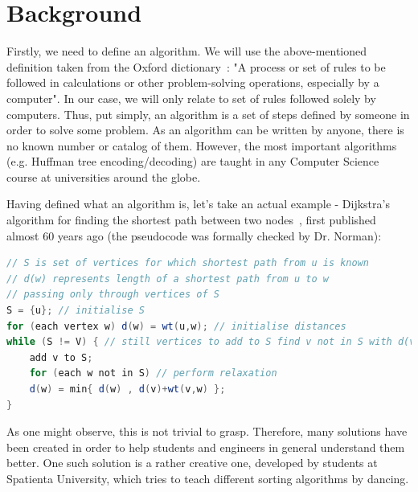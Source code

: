 \documentclass{l4proj}
\begin{document}

\chapter{Background}
\label{background}

Firstly, we need to define an algorithm. We will use the above-mentioned definition taken from the Oxford dictionary~\cite{oxford-dict}: "A process or set of rules to be followed in calculations or other problem-solving operations, especially by a computer". In our case, we will only relate to set of rules followed solely by computers. Thus, put simply, an algorithm is a set of steps defined by someone in order to solve some problem. As an algorithm can be written by anyone, there is no known number or catalog of them. However, the most important algorithms (e.g. Huffman tree encoding/decoding) are taught in any Computer Science course at universities around the globe.

Having defined what an algorithm is, let's take an actual example - Dijkstra's algorithm for finding the shortest path between two nodes~\cite{dijkstra-shortest-path}, first published almost 60 years ago (the pseudocode was formally checked by Dr. Norman):

\begin{lstlisting}[language=Java, caption=Pseudocode for Dijkstra's shortest path algorithm]
// S is set of vertices for which shortest path from u is known
// d(w) represents length of a shortest path from u to w
// passing only through vertices of S
S = {u}; // initialise S
for (each vertex w) d(w) = wt(u,w); // initialise distances
while (S != V) { // still vertices to add to S find v not in S with d(v) minimum;
	add v to S;
	for (each w not in S) // perform relaxation
	d(w) = min{ d(w) , d(v)+wt(v,w) };
}
\end{lstlisting}

As one might observe, this is not trivial to grasp. Therefore, many solutions have been created in order to help students and engineers in general understand them better. One such solution is a rather creative one, developed by students at Spatienta University, which tries to teach different sorting algorithms by dancing.

\pagebreak
\end{document}
